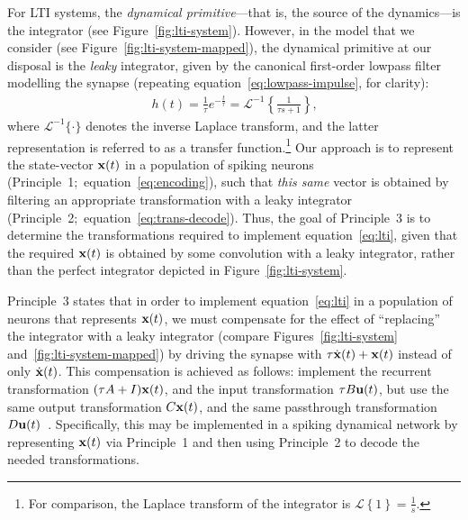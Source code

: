 For LTI systems, the \emph{dynamical primitive}---that is, the source of the dynamics---is the integrator (see Figure~\ref{fig:lti-system}).
However, in the model that we consider (see Figure~\ref{fig:lti-system-mapped}), the dynamical primitive at our disposal is the \emph{leaky} integrator, given by the canonical first-order lowpass filter modelling the synapse (repeating equation~\ref{eq:lowpass-impulse}, for clarity):
\begin{align} \label{eq:lowpass-laplace}
h(t) = \frac{1}{\tau} e^{-\frac{t}{\tau}} = \mathcal{L}^{-1}\left\{ \frac{1}{\tau s + 1} \right\} \text{,}
\end{align}
where $\mathcal{L}^{-1}\{ \cdot \}$ denotes the inverse Laplace transform, and the latter representation is referred to as a transfer function.\footnote{
For comparison, the Laplace transform of the integrator is $\mathcal{L}\left\{ 1 \right\} = \frac{1}{s}$.}
Our approach is to represent the state-vector $\mathbf{x}(t)$ in a population of spiking neurons (Principle~1;~equation~\ref{eq:encoding}), such that \emph{this same} vector is obtained by filtering an appropriate transformation with a leaky integrator (Principle~2;~equation~\ref{eq:trans-decode}).
Thus, the goal of Principle~3 is to determine the transformations required to implement equation~\ref{eq:lti}, given that the required $\mathbf{x}(t)$ is obtained by some convolution with a leaky integrator, rather than the perfect integrator depicted in Figure~\ref{fig:lti-system}.

Principle~3 states that in order to implement equation~\ref{eq:lti} in a population of neurons that represents $\mathbf{x}(t)$, we must compensate for the effect of ``replacing'' the integrator with a leaky integrator (compare Figures~\ref{fig:lti-system} and~\ref{fig:lti-system-mapped}) by driving the synapse with $\tau \dot{\mathbf{x}}(t) + \mathbf{x}(t)$ instead of only $\dot{\mathbf{x}}(t)$.
This compensation is achieved as follows: implement the recurrent transformation $(\tau A + I)\mathbf{x}(t)$, and the input transformation $\tau B \mathbf{u}(t)$, but use the same output transformation $C\mathbf{x}(t)$, and the same passthrough transformation $D\mathbf{u}(t)$~\citep[][pp.~221--225]{eliasmith2003a}.
Specifically, this may be implemented in a spiking dynamical network by representing $\mathbf{x}(t)$ via Principle~1 and then using Principle~2 to decode the needed transformations.

